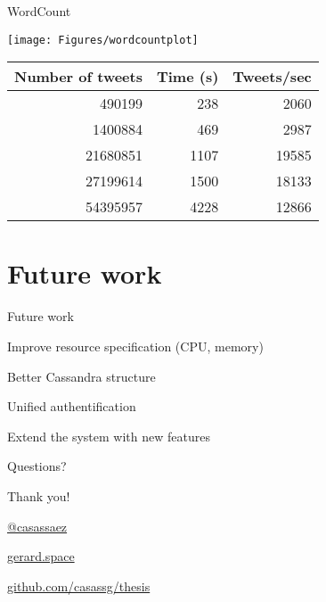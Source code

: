 \documentclass{beamer}
\newenvironment{wideitemize}{\itemize\addtolength{\itemsep}{20pt}}{\enditemize}
\newcommand{\pdfnote}[1]{\marginnote{\pdfcomment[icon=note]{#1}}}
\newcommand{\hugeframedouble}[2]{
\begin{frame}[c]
  \begin{center}
    \huge\textcolor{title}{#1}
    \vfill

    \normalsize #2

  \end{center}

\end{frame}
}
\newcommand{\hugeframe}[1]{
\begin{frame}[c]
  \begin{center}
    \huge\textcolor{title}{#1}
  \end{center}

\end{frame}
}
\begin{document}
\begin{frame}{WordCount}
    \begin{center}
      \texttt{[image: Figures/wordcountplot]}
      \pdfnote{27M in 25 min}
       \begin{table}
      \centering
        \begin{tabular}{r r r}
        \hline
        \textbf{Number of tweets} & \textbf{Time (s)} & \textbf{Tweets/sec}\\
        \hline
        490199 & 238 & 2060 \\
        \hline
        1400884 & 469 & 2987 \\
        \hline
        21680851 & 1107 & 19585 \\
        \hline
        27199614 & 1500 & 18133 \\
        \hline
        54395957 & 4228 & 12866 \\
        \hline
        \end{tabular}
      \end{table}

    \end{center}
\end{frame}







\section{Future work}
\begin{frame}{Future work}
\begin{wideitemize}
  \item Improve resource specification (CPU, memory)
  \item Better Cassandra structure
  \item Unified authentification
  \item Extend the system with new features
\end{wideitemize}
\end{frame}





\hugeframe{Questions?}


\hugeframedouble{Thank you!}{
\begin{description}
  \addtolength{\itemsep}{5pt}
  \item[\textbf{Twitter}]  \href{http://twitter.com/casassaez}{@casassaez}
  \item[\textbf{Website}]  \href{http://gerard.space}{gerard.space}
  \item[\textbf{Repo}] \href{http://github.com/casassg/thesis}{github.com/casassg/thesis}

\end{description} 

}
\end{document}
